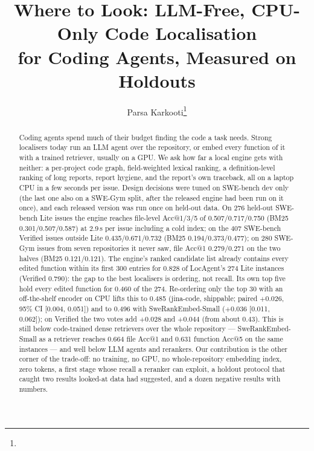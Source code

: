 \documentclass[10pt,twocolumn]{article}
\title{Where to Look: LLM-Free, CPU-Only Code Localisation\\for Coding Agents, Measured on Holdouts}
\author{Parsa Karkooti\thanks{\todo{affiliation and co-authors}}}
\date{}
\makeatletter
\newcommand{\accat}[1]{Acc@#1}
\makeatother
\begin{document}
\maketitle

\begin{abstract}
Coding agents spend much of their budget finding the code a task needs. Strong localisers today
run an LLM agent over the repository, or embed every function of it with a trained retriever,
usually on a GPU. We ask how far a local engine gets with neither: a per-project code graph,
field-weighted lexical ranking, a definition-level ranking of long reports, report hygiene, and the
report's own traceback, all on a laptop CPU in a few seconds per issue. Design decisions were
tuned on SWE-bench dev only (the last one also on a SWE-Gym split, after the released engine had
been run on it once), and each released version was run once on held-out data. On 276 held-out SWE-bench Lite issues the engine reaches file-level
\accat{1}/3/5 of 0.507/0.717/0.750 (BM25 0.301/0.507/0.587) at 2.9\,s per issue including a cold
index; on the 407 SWE-bench Verified issues outside Lite 0.435/0.671/0.732 (BM25
0.194/0.373/0.477); on 280 SWE-Gym issues from seven repositories it never saw, file \accat{1}
0.279/0.271 on the two halves (BM25 0.121/0.121). The engine's ranked candidate list already
contains every edited function within its first 300 entries for 0.828 of LocAgent's 274 Lite
instances (Verified 0.790): the gap to the best localisers is ordering, not recall. Its own top five
hold every edited function for 0.460 of the 274. Re-ordering only the top 30 with an off-the-shelf
encoder on CPU lifts this to 0.485 (jina-code, shippable; paired $+0.026$, 95\% CI [0.004, 0.051])
and to 0.496 with SweRankEmbed-Small ($+0.036$ [0.011, 0.062]); on Verified the two votes add
$+0.028$ and $+0.044$ (from about 0.43). This is still below code-trained dense retrievers over the whole repository ---
SweRankEmbed-Small as a retriever reaches 0.664 file \accat{1} and 0.631 function \accat{5} on the
same instances --- and well below LLM agents and rerankers. Our contribution is the other corner of
the trade-off: no training, no GPU, no whole-repository embedding index, zero tokens, a first stage
whose recall a reranker can exploit, a holdout protocol that caught two results looked-at data had
suggested, and a dozen negative results with numbers.
\end{abstract}
\end{document}
